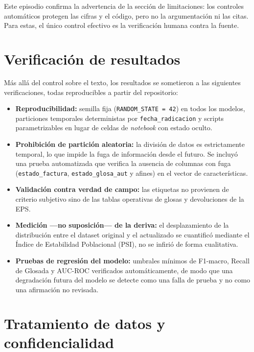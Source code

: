 \documentclass[12pt,letterpaper]{report}
\begin{document}
Este episodio confirma la advertencia de la sección de limitaciones: los controles
automáticos protegen las cifras y el código, pero no la argumentación ni las citas.
Para estas, el único control efectivo es la verificación humana contra la fuente.

\section{Verificación de resultados}

Más allá del control sobre el texto, los resultados se sometieron a las siguientes
verificaciones, todas reproducibles a partir del repositorio:

\begin{itemize}
    \item \textbf{Reproducibilidad:} semilla fija (\texttt{RANDOM\_STATE = 42}) en todos
    los modelos, particiones temporales deterministas por \texttt{fecha\_radicacion} y
    scripts parametrizables en lugar de celdas de \textit{notebook} con estado oculto.

    \item \textbf{Prohibición de partición aleatoria:} la división de datos es
    estrictamente temporal, lo que impide la fuga de información desde el futuro. Se
    incluyó una prueba automatizada que verifica la ausencia de columnas con fuga
    (\texttt{estado\_factura}, \texttt{estado\_glosa\_aut} y afines) en el vector de
    características.

    \item \textbf{Validación contra verdad de campo:} las etiquetas no provienen de
    criterio subjetivo sino de las tablas operativas de glosas y devoluciones de la EPS.

    \item \textbf{Medición —no suposición— de la deriva:} el desplazamiento de la
    distribución entre el dataset original y el actualizado se cuantificó mediante el
    Índice de Estabilidad Poblacional (PSI), no se infirió de forma cualitativa.

    \item \textbf{Pruebas de regresión del modelo:} umbrales mínimos de F1-macro, Recall
    de Glosada y AUC-ROC verificados automáticamente, de modo que una degradación futura
    del modelo se detecte como una falla de prueba y no como una afirmación no revisada.
\end{itemize}

\section{Tratamiento de datos y confidencialidad}
\end{document}
